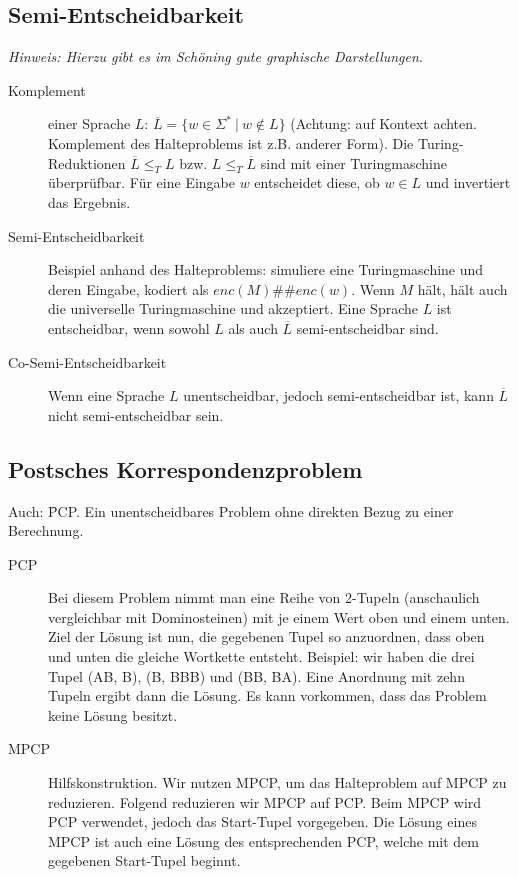 \subsection{Semi-Entscheidbarkeit}
    \textit{Hinweis: Hierzu gibt es im Schöning gute graphische Darstellungen}. 
    \begin{description}
        \item[Komplement] einer Sprache $L$: $\overline{L} = \{w \in \Sigma^* ~|~ w \notin L \}$ (Achtung: auf Kontext achten. Komplement des Halteproblems ist z.B. anderer Form). Die Turing-Reduktionen $\overline{L} \leq_T L$ bzw. $L \leq_T \overline{L}$ sind mit einer Turingmaschine überprüfbar. Für eine Eingabe $w$ entscheidet diese, ob $w \in L$ und invertiert das Ergebnis.
        \item[Semi-Entscheidbarkeit] Beispiel anhand des Halteproblems: simuliere eine Turingmaschine und deren Eingabe, kodiert als $enc(M)\#\#enc(w)$. Wenn $M$ hält, hält auch die universelle Turingmaschine und akzeptiert. Eine Sprache $L$ ist entscheidbar, wenn sowohl $L$ als auch $\overline{L}$ semi-entscheidbar sind.
        \item[Co-Semi-Entscheidbarkeit] Wenn eine Sprache $L$ unentscheidbar, jedoch semi-entscheidbar ist, kann $\overline{L}$ nicht semi-entscheidbar sein.
    \end{description}


\subsection{Postsches Korrespondenzproblem}
    Auch: \f{PCP}. Ein unentscheidbares Problem ohne direkten Bezug zu einer Berechnung. 
    \begin{description}
        \item[PCP] Bei diesem Problem nimmt man eine Reihe von 2-Tupeln (anschaulich vergleichbar mit Dominosteinen) mit je einem Wert oben und einem unten. Ziel der Lösung ist nun, die gegebenen Tupel so anzuordnen, dass oben und unten die gleiche Wortkette entsteht. Beispiel: wir haben die drei Tupel (AB, B), (B, BBB) und (BB, BA). Eine Anordnung mit zehn Tupeln ergibt dann die Lösung. Es kann vorkommen, dass das Problem keine Lösung besitzt.
        \item[MPCP] Hilfskonstruktion. Wir nutzen MPCP, um das Halteproblem auf MPCP zu reduzieren. Folgend reduzieren wir MPCP auf PCP. Beim MPCP wird PCP verwendet, jedoch das Start-Tupel vorgegeben. Die Lösung eines MPCP ist auch eine Lösung des entsprechenden PCP, welche mit dem gegebenen Start-Tupel beginnt.
    \end{description}


